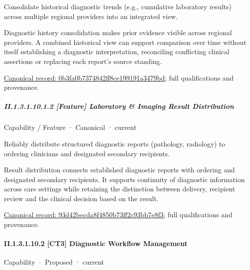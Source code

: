 Consolidate historical diagnostic trends (e.g., cumulative laboratory results) across multiple regional providers into an integrated view.



Diagnostic history consolidation makes prior evidence visible across regional providers. A combined historical view can support comparison over time without itself establishing a diagnostic interpretation, reconciling conflicting clinical assertions or replacing each report's source standing.


{\footnotesize \href{../../../../continuum/strategy/capability/feature/0b3fa0b7374842ff8ce199191a3479bd.md}{Canonical record: 0b3fa0b7374842ff8ce199191a3479bd}; full qualifications and provenance.}\par
\subparagraph*{II.1.3.1.10.1.2 [Feature] Laboratory \& Imaging Result Distribution}
\label{navigation:II.1.3.1.10.1.2}

\label{element:93d42becda8f4850b73ff2c93bb7e8f3}
{\small Capability / Feature · Canonical · current}\par

Reliably distribute structured diagnostic reports (pathology, radiology) to ordering clinicians and designated secondary recipients.



Result distribution connects established diagnostic reports with ordering and designated secondary recipients. It supports continuity of diagnostic information across care settings while retaining the distinction between delivery, recipient review and the clinical decision based on the result.


{\footnotesize \href{../../../../continuum/strategy/capability/feature/93d42becda8f4850b73ff2c93bb7e8f3.md}{Canonical record: 93d42becda8f4850b73ff2c93bb7e8f3}; full qualifications and provenance.}\par
\paragraph*{II.1.3.1.10.2 [CT3] Diagnostic Workflow Management}
\label{navigation:II.1.3.1.10.2}

\label{element:270ed0e32b294458aa52cf57df7e55db}
{\small Capability · Proposed · current}\par

